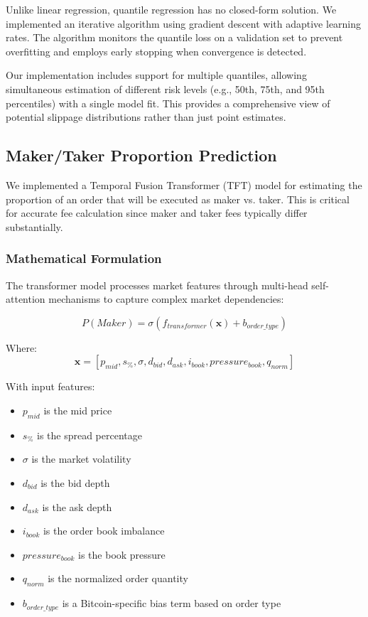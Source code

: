 \documentclass[10pt,twocolumn,a4paper]{IEEEtran}
\begin{document}
Unlike linear regression, quantile regression has no closed-form solution. We implemented an iterative algorithm using gradient descent with adaptive learning rates. The algorithm monitors the quantile loss on a validation set to prevent overfitting and employs early stopping when convergence is detected.

Our implementation includes support for multiple quantiles, allowing simultaneous estimation of different risk levels (e.g., 50th, 75th, and 95th percentiles) with a single model fit. This provides a comprehensive view of potential slippage distributions rather than just point estimates.

\subsection{Maker/Taker Proportion Prediction}

We implemented a Temporal Fusion Transformer (TFT) model for estimating the proportion of an order that will be executed as maker vs. taker. This is critical for accurate fee calculation since maker and taker fees typically differ substantially.

\subsubsection{Mathematical Formulation}
The transformer model processes market features through multi-head self-attention mechanisms to capture complex market dependencies:

\begin{equation}
P(Maker) = \sigma(f_{transformer}(\mathbf{x}) + b_{order\_type})
\end{equation}

Where:
\begin{equation}
\mathbf{x} = [p_{mid}, s_{\%}, \sigma, d_{bid}, d_{ask}, i_{book}, pressure_{book}, q_{norm}]
\end{equation}

With input features:
\begin{itemize}
    \item $p_{mid}$ is the mid price
    \item $s_{\%}$ is the spread percentage
    \item $\sigma$ is the market volatility
    \item $d_{bid}$ is the bid depth
    \item $d_{ask}$ is the ask depth
    \item $i_{book}$ is the order book imbalance
    \item $pressure_{book}$ is the book pressure
    \item $q_{norm}$ is the normalized order quantity
    \item $b_{order\_type}$ is a Bitcoin-specific bias term based on order type
\end{itemize}
\end{document}
